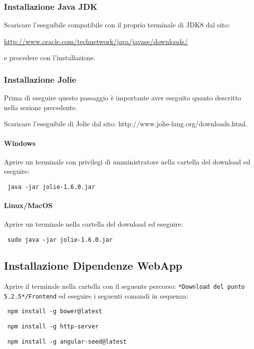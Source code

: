 \subsubsection{Installazione Java JDK}
Scaricare l’eseguibile compatibile con il proprio terminale di JDK8 dal sito:
	\begin{center}
		 \url{http://www.oracle.com/technetwork/java/javase/downloads/} 
	 \end{center}
e procedere con l’installazione.

\subsubsection{Installazione Jolie}
Prima di eseguire questo passaggio è importante aver eseguito quanto descritto nella sezione precedente.

Scaricare l’eseguibile di Jolie dal sito: http://www.jolie-lang.org/downloads.html. 
\paragraph{Windows}
Aprire un terminale con privilegi di amministratore nella cartella del download ed eseguire:
	\begin{center}
	 \verb| java -jar jolie-1.6.0.jar|
	\end{center}
\paragraph{Linux/MacOS}
Aprire un terminale nella cartella del download ed eseguire:
	\begin{center}
	 \verb| sudo java -jar jolie-1.6.0.jar|
	\end{center}
\subsection{Installazione Dipendenze WebApp}
Aprire il terminale nella cartella con il seguente percorso: \verb|*Download del punto 5.2.5*/Frontend| ed eseguire i seguenti comandi in sequenza:
	\begin{center}
	\verb| npm install -g bower@latest|
\end{center}

	\begin{center}
	\verb| npm install -g http-server|
\end{center}

	\begin{center}
	\verb| npm install -g angular-seed@latest|
\end{center}


